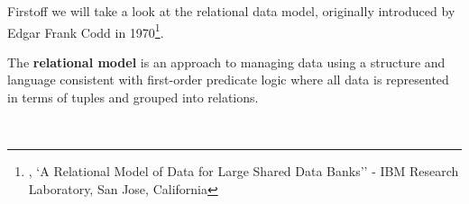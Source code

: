{Firstoff we will take a look at the relational data model, originally introduced by Edgar Frank Codd in 1970\footnote{\cite{CODDRDM}, `A Relational Model of Data for Large Shared Data Banks'' - IBM Research Laboratory, San Jose, California}. \\[0.5 cm]
\hspace*{4mm}%
\hspace*{4mm}%
\begin{minipage}{0.8\textwidth}\raggedright
The \textbf{relational model} is an approach to managing data using a structure and language consistent with first-order predicate logic where all data is represented in terms of tuples and grouped into relations. 
\end{minipage}\\[0.5 cm]

}
